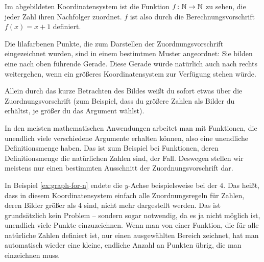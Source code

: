 \documentclass[../../main.tex]{subfiles}
\begin{document}
\begin{example}{}

    Im abgebildeten Koordinatensystem ist die Funktion $f\colon\mathbb{N}\rightarrow\mathbb{N}$ zu sehen, die jeder Zahl ihren Nachfolger zuordnet. $f$ ist also durch die Berechnungsvorschrift $f(x)=x+1$ definiert.
    
    Die lilafarbenen Punkte, die zum Darstellen der Zuordnungsvorschrift eingezeichnet wurden, sind in einem bestimtmen Muster angeordnet: Sie bilden eine nach oben führende Gerade. Diese Gerade würde natürlich auch nach rechts weitergehen, wenn ein größeres Koordinatensystem zur Verfügung stehen würde.
    
    Allein durch das kurze Betrachten des Bildes weißt du sofort etwas über die Zuordnungsvorschrift (zum Beispiel, dass du größere Zahlen als Bilder du erhältst, je größer du das Argument wählst).
\end{example}

In den meisten mathematischen Anwendungen arbeitet man mit Funktionen, die unendlich viele verschiedene Argumente erhalten können, also eine unendliche Definitionsmenge haben. Das ist zum Beispiel bei Funktionen, deren Definitionsmenge die natürlichen Zahlen sind, der Fall. Deswegen stellen wir meistens nur einen bestimmten Ausschnitt der Zuordnungsvorschrift dar.

In Beispiel \ref{ex:graph-for-n} endete die $y$-Achse beispielsweise bei der $4$. Das heißt, dass in diesem Koordinatensystem einfach alle Zuordnungsregeln für Zahlen, deren Bilder größer als $4$ sind, nicht mehr dargestellt werden. Das ist grundsätzlich kein Problem -- sondern sogar notwendig, da es ja nicht möglich ist, unendlich viele Punkte einzuzeichnen. Wenn man von einer Funktion, die für alle natürliche Zahlen definiert ist, nur einen ausgewählten Bereich zeichnet, hat man automatisch wieder eine kleine, endliche Anzahl an Punkten übrig, die man einzeichnen muss.
\end{document}
